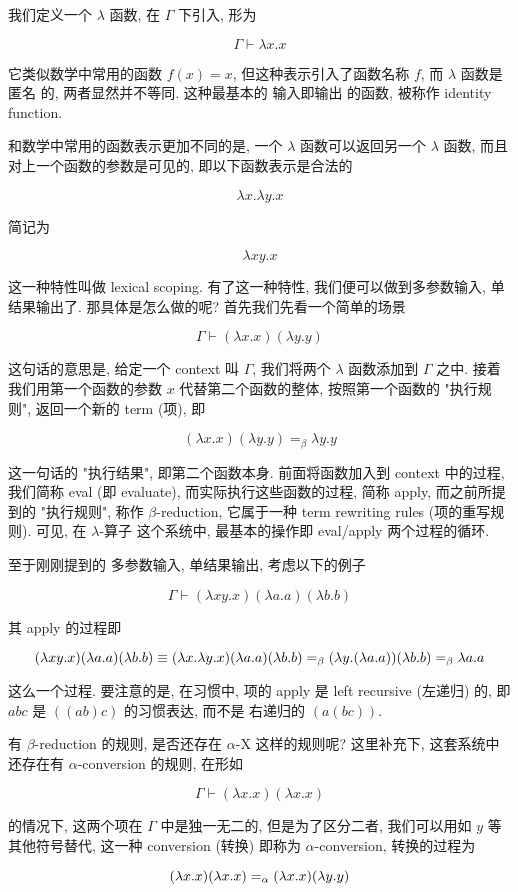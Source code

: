 \documentclass[11pt]{article}
\begin{document}
我们定义一个 $\lambda$ 函数, 在 $\Gamma$ 下引入, 形为

$$\Gamma \vdash \lambda x . x$$

它类似数学中常用的函数 $f(x) = x$, 但这种表示引入了函数名称 $f$, 而 $\lambda$ 函数是 匿名 的, 两者显然并不等同. 这种最基本的 输入即输出 的函数, 被称作 identity function.

和数学中常用的函数表示更加不同的是, 一个 $\lambda$ 函数可以返回另一个 $\lambda$ 函数, 而且对上一个函数的参数是可见的, 即以下函数表示是合法的

$$\lambda x . \lambda y . x$$

简记为

$$\lambda x y . x$$

这一种特性叫做 lexical scoping. 有了这一种特性, 我们便可以做到多参数输入, 单结果输出了. 那具体是怎么做的呢? 首先我们先看一个简单的场景

$$\Gamma \vdash (\lambda x . x) (\lambda y . y)$$

这句话的意思是, 给定一个 context 叫 $\Gamma$, 我们将两个 $\lambda$ 函数添加到 $\Gamma$ 之中. 接着我们用第一个函数的参数 $x$ 代替第二个函数的整体, 按照第一个函数的 "执行规则", 返回一个新的 term (项), 即

$$(\lambda x . x) (\lambda y . y) = _\beta \lambda y . y$$

这一句话的 "执行结果", 即第二个函数本身. 前面将函数加入到 context 中的过程, 我们简称 eval (即 evaluate), 而实际执行这些函数的过程, 简称 apply, 而之前所提到的 "执行规则", 称作 $\beta$-reduction, 它属于一种 term rewriting rules (项的重写规则). 可见, 在 $\lambda$-算子 这个系统中, 最基本的操作即 eval/apply 两个过程的循环.

至于刚刚提到的 多参数输入, 单结果输出, 考虑以下的例子

$$\Gamma \vdash (\lambda xy.x) (\lambda a.a) (\lambda b.b)$$

其 apply 的过程即

$$ (\lambda xy.x) (\lambda a.a) (\lambda b.b) \equiv (\lambda x.\lambda y.x) (\lambda a.a) (\lambda b.b) \\ = _\beta (\lambda y.(\lambda a.a)) (\lambda b.b) \\ = _\beta \lambda a.a $$

这么一个过程. 要注意的是, 在习惯中, 项的 apply 是 left recursive (左递归) 的, 即 $a b c$ 是 $((a b) c)$ 的习惯表达, 而不是 右递归的 $(a (b c))$.

有 $\beta$-reduction 的规则, 是否还存在 $\alpha$-X 这样的规则呢? 这里补充下, 这套系统中还存在有 $\alpha$-conversion 的规则, 在形如

$$\Gamma \vdash (\lambda x . x) (\lambda x . x)$$

的情况下, 这两个项在 $\Gamma$ 中是独一无二的, 但是为了区分二者, 我们可以用如 $y$ 等其他符号替代, 这一种 conversion (转换) 即称为 $\alpha$-conversion, 转换的过程为

$$ (\lambda x . x) (\lambda x . x) \\ = _\alpha (\lambda x . x) (\lambda y . y) $$
\end{document}
